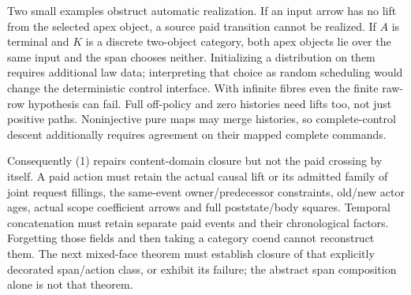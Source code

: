 \documentclass[11pt]{article}
\begin{document}
Two small examples obstruct automatic realization. If an input arrow has no lift from the selected apex object, a source paid transition cannot be realized. If $A$ is terminal and $K$ is a discrete two-object category, both apex objects lie over the same input and the span chooses neither. Initializing a distribution on them requires additional law data; interpreting that choice as random scheduling would change the deterministic control interface. With infinite fibres even the finite raw-row hypothesis can fail. Full off-policy and zero histories need lifts too, not just positive paths. Noninjective pure maps may merge histories, so complete-control descent additionally requires agreement on their mapped complete commands.

Consequently (1) repairs content-domain closure but not the paid crossing by itself. A paid action must retain the actual causal lift or its admitted family of joint request fillings, the same-event owner/predecessor constraints, old/new actor ages, actual scope coefficient arrows and full poststate/body squares. Temporal concatenation must retain separate paid events and their chronological factors. Forgetting those fields and then taking a category coend cannot reconstruct them. The next mixed-face theorem must establish closure of that explicitly decorated span/action class, or exhibit its failure; the abstract span composition alone is not that theorem.
\end{document}
